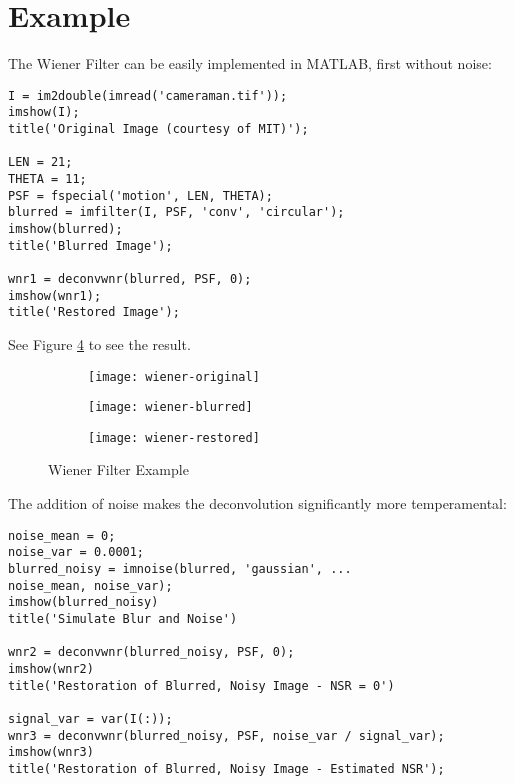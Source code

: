 \section{Example}
The Wiener Filter can be easily implemented in MATLAB, first without noise:
\begin{lstlisting}
I = im2double(imread('cameraman.tif'));
imshow(I);
title('Original Image (courtesy of MIT)');

LEN = 21;
THETA = 11;
PSF = fspecial('motion', LEN, THETA);
blurred = imfilter(I, PSF, 'conv', 'circular');
imshow(blurred);
title('Blurred Image');

wnr1 = deconvwnr(blurred, PSF, 0);
imshow(wnr1);
title('Restored Image');
\end{lstlisting}
See Figure \ref{fig:wiener} to see the result.

\begin{figure}[ht]
	\centering
	\begin{subfigure}[b]{0.3\textwidth}
		\centering
		\texttt{[image: wiener-original]}
		\caption{}
		\label{fig:wiener-original}
	\end{subfigure}\hfill
	\begin{subfigure}[b]{0.3\textwidth}
		\centering
		\texttt{[image: wiener-blurred]}
		\caption{}
		\label{fig:wiener-blurred}
	\end{subfigure}\hfill
	\begin{subfigure}[b]{0.3\textwidth}
		\centering
		\texttt{[image: wiener-restored]}
		\caption{}
		\label{fig:wiener-restored}
	\end{subfigure}
	\caption{Wiener Filter Example}\label{fig:wiener}
\end{figure}


The addition of noise makes the deconvolution significantly more temperamental:
\begin{lstlisting}
noise_mean = 0;
noise_var = 0.0001;
blurred_noisy = imnoise(blurred, 'gaussian', ...
noise_mean, noise_var);
imshow(blurred_noisy)
title('Simulate Blur and Noise')

wnr2 = deconvwnr(blurred_noisy, PSF, 0);
imshow(wnr2)
title('Restoration of Blurred, Noisy Image - NSR = 0')

signal_var = var(I(:));
wnr3 = deconvwnr(blurred_noisy, PSF, noise_var / signal_var);
imshow(wnr3)
title('Restoration of Blurred, Noisy Image - Estimated NSR');
\end{lstlisting}

